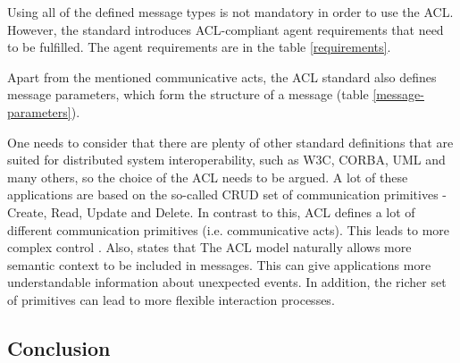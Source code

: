 \documentclass[0main.tex]{subfiles}
\begin{document}
Using all of the defined message types is not mandatory in order to use the ACL.
However, the standard introduces ACL-compliant agent requirements that need to be fulfilled. The 
agent requirements are in the table \ref{requirements}. 

Apart from the mentioned communicative acts, the ACL standard also defines message parameters, which
form the structure of a message (table \ref{message-parameters}).



One needs to consider that there are plenty of other standard definitions that are suited for
distributed system interoperability, such as W3C, CORBA, UML and many others, so the choice 
of the ACL needs to be argued. A lot of these applications are based on the so-called CRUD set of 
communication primitives - Create, Read, Update and Delete. In contrast to this, ACL defines a lot 
of different communication primitives (i.e. communicative acts). This leads to more complex control 
\cite{Poslad2007}. 
Also, \cite{Poslad2007} states that The ACL model naturally allows more semantic context
to be included in messages. This can give applications more understandable information about
unexpected events. In addition, the richer set of primitives can lead to more flexible
interaction processes.

\subsection{Conclusion}
\end{document}
